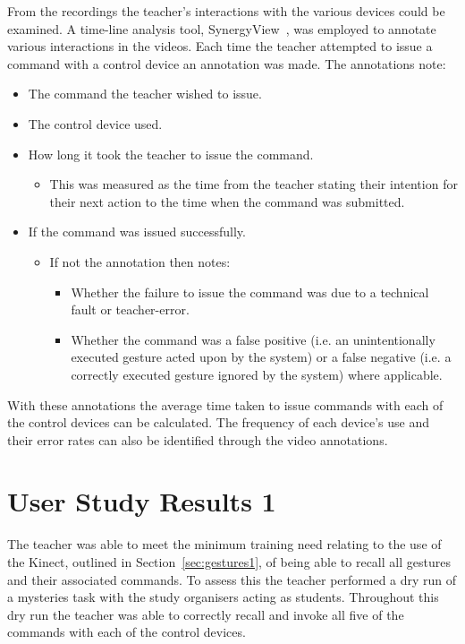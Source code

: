 \documentclass[manuscript, review, screen]{acmart}
\begin{document}
From the recordings the teacher's interactions with the various devices could be examined.
A time-line analysis tool, SynergyView~\cite{Kyaw2011}, was employed to annotate various interactions in the videos.
Each time the teacher attempted to issue a command with a control device an annotation was made.
The annotations note:
\begin{itemize}
\item The command the teacher wished to issue.
\item The control device used.
\item How long it took the teacher to issue the command.
\begin{itemize}
\item This was measured as the time from the teacher stating their intention for their next action to the time when the command was submitted.
\end{itemize}
\item If the command was issued successfully.
\begin{itemize}
\item If not the annotation then notes:
\begin{itemize}
\item Whether the failure to issue the command was due to a technical fault or teacher-error.
\item Whether the command was a false positive (i.e. an unintentionally executed gesture acted upon by the system) or a false negative (i.e. a correctly executed gesture ignored by the system) where applicable.\\
\end{itemize}
\end{itemize}
\end{itemize}
With these annotations the average time taken to issue commands with each of the control devices can be calculated.
The frequency of each device's use and their error rates can also be identified through the video annotations.


\section{User Study Results 1}
\label{sec:evaluationresults1}


The teacher was able to meet the minimum training need relating to the use of the Kinect, outlined in Section~\ref{sec:gestures1}, of being able to recall all gestures and their associated commands.
To assess this the teacher performed a dry run of a mysteries task with the study organisers acting as students.
Throughout this dry run the teacher was able to correctly recall and invoke all five of the commands with each of the control devices.
\end{document}
